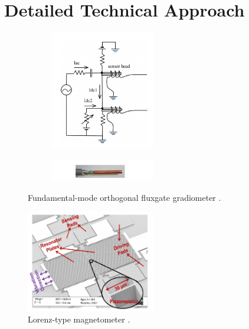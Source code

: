 \section{Detailed Technical Approach}

\begin{figure}[h]
  \centering
  \begin{subfigure}
    \centering
    \includegraphics[width=0.5\textwidth]{fmofg}
  \end{subfigure}
  \begin{subfigure}
    \centering
    \includegraphics[width=0.5\textwidth]{fmofg2}
  \end{subfigure}
\caption{Fundamental-mode orthogonal fluxgate gradiometer \cite{sasada2014fundamental}.}
\label{fig:fmofg}
\end{figure}

\begin{figure}[h]
\centering
\includegraphics[width=0.5\textwidth]{lorenz2}
\caption{Lorenz-type magnetometer \cite{kumar2015ultra}.}
\label{fig:lorenz}
\end{figure}

